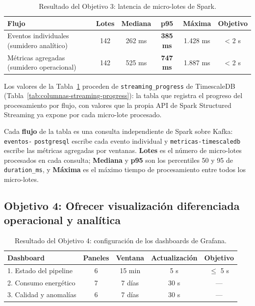 \begin{table}[H]
  \centering
  \begin{tabular}{|p{3.5cm}|c|c|c|c|c|}
    \hline
    \textbf{Flujo} & \textbf{Lotes} & \textbf{Mediana} & \textbf{p95} & \textbf{Máxima} & \textbf{Objetivo} \\ \hline
    Eventos individuales (sumidero analítico) & 142 & 262 ms & \textbf{385 ms} & 1.428 ms & < 2 s \\ \hline
    Métricas agregadas (sumidero operacional) & 142 & 525 ms & \textbf{747 ms} & 1.887 ms & < 2 s \\ \hline
  \end{tabular}
  \caption{Resultado del Objetivo 3: latencia de micro-lotes de Spark.}
  \label{tab:resultado-obj3}
\end{table}

Los valores de la Tabla~\ref{tab:resultado-obj3} proceden de \texttt{streaming\_progress} de TimescaleDB (Tabla~\ref{tab:columnas-streaming-progress}): la tabla que registra el progreso del procesamiento por flujo, con valores que la propia API de Spark Structured Streaming ya expone por cada micro-lote procesado.

Cada \textbf{flujo} de la tabla es una consulta independiente de Spark sobre Kafka: \texttt{eventos-} \texttt{postgresql} escribe cada evento individual y \texttt{metricas-timescaledb} escribe las métricas agregadas por ventanas. \textbf{Lotes} es el número de micro-lotes procesados en cada consulta; \textbf{Mediana} y \textbf{p95} son los percentiles 50 y 95 de \texttt{duration\_ms}, y \textbf{Máxima} es el máximo tiempo de procesamiento entre todos los micro-lotes.

\subsection{Objetivo 4: Ofrecer visualización diferenciada operacional y analítica}

\begin{table}[H]
  \centering
  \begin{tabular}{|p{4.5cm}|c|c|c|c|}
    \hline
    \textbf{Dashboard} & \textbf{Paneles} & \textbf{Ventana} & \textbf{Actualización} & \textbf{Objetivo} \\ \hline
    1. Estado del pipeline & 6 & 15 min & 5 s & $\leq$ 5 s \\ \hline
    2. Consumo energético & 7 & 7 días & 30 s & --- \\ \hline
    3. Calidad y anomalías & 6 & 7 días & 30 s & --- \\ \hline
  \end{tabular}
  \caption{Resultado del Objetivo 4: configuración de los dashboards de Grafana.}
  \label{tab:resultado-obj4-grafana}
\end{table}

